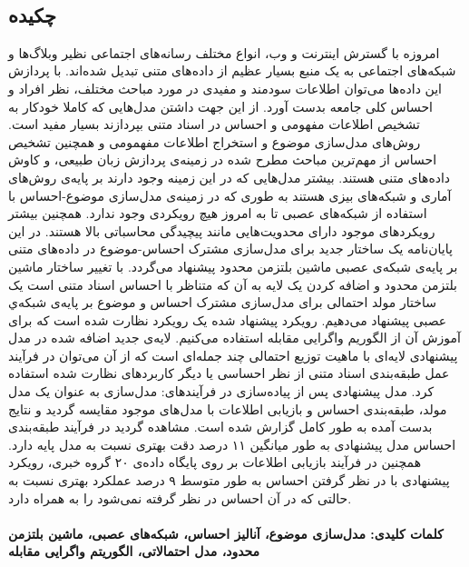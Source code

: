 
\setcounter{page}{1}
\thispagestyle{empty}

~\vfill

\subsection*{چکیده}
\begin{small}
\baselineskip=0.7cm
امروزه با گسترش اینترنت و وب، انواع مختلف رسانه‌های اجتماعی نظیر وبلاگ‌ها و شبکه‌های اجتماعی به یک منبع بسیار عظیم از داده‌‌های متنی تبدیل شده‌اند. با پردازش این داده‌ها می‌‌توان اطلاعات سودمند و مفیدی در مورد مباحث مختلف، نظر افراد و احساس کلی‌ جامعه بدست آورد. از این جهت داشتن مدل‌هایی که کاملا خودکار به تشخیص اطلاعات مفهومی‌ و احساس در اسناد متنی بپردازند بسیار مفید است. روش‌های مدل‌سازی موضوع و استخراج اطلاعات مفهمومی و همچنین تشخیص احساس از مهم‌ترین مباحث مطرح شده در زمینه‌ی پردازش زبان طبیعی، و کاوش داده‌های متنی هستند. بیشتر مدل‌هایی که در این زمینه وجود دارند بر پایه‌ی روش‌های آماری و شبکه‌های بیزی هستند به طوری که در زمینه‌ی مدل‌سازی موضوع-احساس با استفاده از شبکه‌های عصبی تا به امروز هیچ رویکردی وجود ندارد. همچنین بیشتر رویکردهای موجود دارای محدویت‌هایی مانند پیچیدگی محاسباتی بالا هستند. در این پایان‌نامه یک ساختار جدید برای مدل‌سازی مشترک احساس-موضوع در داده‌های متنی بر پایه‌ی شبکه‌‌ی عصبی ماشین بلتزمن محدود پیشنهاد می‌‌گردد. با تغییر ساختار ماشین بلتزمن محدود و اضافه کردن یک لایه به آن که متناظر با احساس اسناد متنی است یک ساختار مولد احتمالی برای مدل‌سازی مشترک احساس و موضوع بر پایه‌ی ‌شبکه‌ي عصبی پیشنهاد می‌‌دهیم. رویکرد پیشنهاد شده یک رویکرد نظارت شده است که برای آموزش آن از الگوریم واگرایی مقابله استفاده می‌‌کنیم. لایه‌ی جدید اضافه شده در مدل پیشنهادی لایه‌ای با ماهیت توزیع احتمالی‌ چند جمله‌ای است که از آن می‌‌توان در فرآیند عمل طبقه‌بندی اسناد متنی از نظر احساسی‌ یا دیگر کاربرد‌های نظارت شده استفاده کرد. مدل پیشنهادی پس از پیاده‌سازی در فرآیندهای: مدل‌سازی به عنوان یک مدل مولد، طبقه‌بندی احساس و بازیابی اطلاعات با مدل‌های موجود مقایسه گردید و نتایج بدست آمده به طور کامل گزارش شده است. مشاهده گردید در فرآیند طبقه‌بندی احساس مدل پیشنهادی به طور میانگین ۱۱ درصد دقت بهتری نسبت به مدل پایه دارد. همچنین در فرآیند بازیابی اطلاعات بر روی پایگاه داده‌ی ۲۰ گروه خبری، رویکرد پیشنهادی با در نظر گرفتن احساس به طور متوسط ۹ درصد عملکرد بهتری نسبت به حالتی که در آن احساس در نظر گرفته نمی‌‌شود را به همراه دارد.\\

 
\texttt{}
\\

\noindent\textbf{کلمات کلیدی: مدل‌سازی موضوع، آنالیز احساس، شبکه‌ها‌ی عصبی، ماشین بلتزمن محدود، مدل احتمالاتی، الگوریتم واگرایی مقابله}
\end{small} 